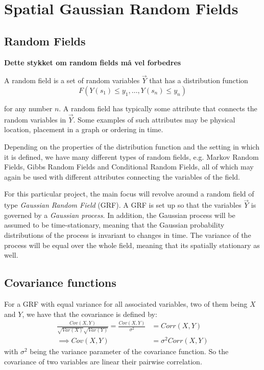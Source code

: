 \section{Spatial Gaussian Random Fields}
\subsection{Random Fields}
\textbf{Dette stykket om random fields må vel forbedres}

A random field is a set of random variables $\vec{Y}$ that has a distribution function 
\begin{equation} \label{eq:distribution_function}
F(Y(s_1) \leq y_1, \dots , Y(s_n) \leq y_n)
\end{equation} 

for any number $n$. A random field has typically some attribute that connects the random variables in $\vec{Y}$. Some examples of such attributes may be physical location, placement in a graph or ordering in time.

Depending on the properties of the distribution function and the setting in which it is defined, we have many different types of random fields, e.g. Markov Random Fields, Gibbs Random Fields and Conditional Random Fields, all of which may again be used with different attributes connecting the variables of the field. 

For this particular project, the main focus will revolve around a random field of type \textit{Gaussian Random Field} (GRF). A GRF is set up so that the variables $\vec{Y}$ is governed by a \textit{Gaussian process}. In addition, the Gaussian process will be assumed to be time-stationary, meaning that the Gaussian probability distributions of the process is invariant to changes in time. The variance of the process will be equal over the whole field, meaning that its spatially stationary as well. 

\subsection{Covariance functions} \label{sec:covariance_functions}

For a GRF with equal variance for all associated variables, two of them being $X$ and $Y$, we have that the covariance is defined by:
\begin{align*}
\frac{Cov( X, Y )}{\sqrt{Var( X )}\sqrt{Var( Y )}} = \frac{Cov( X, Y )}{\sigma^2} &= Corr(X, Y) \\
\implies  Cov( X, Y ) &= \sigma^2 Corr(X, Y)
\end{align*}
with $\sigma^2$ being the variance parameter of the covariance function. So the covariance of two variables are linear their pairwise correlation. \\


